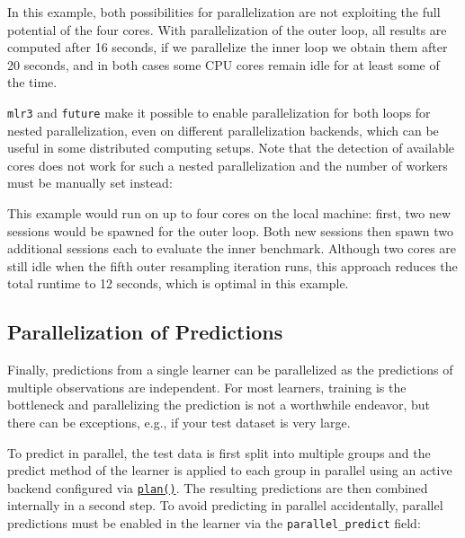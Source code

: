 In this example, both possibilities for parallelization are not
exploiting the full potential of the four cores. With parallelization of
the outer loop, all results are computed after 16 seconds, if we
parallelize the inner loop we obtain them after 20 seconds, and in both
cases some CPU cores remain idle for at least some of the time.

\texttt{mlr3} and \texttt{future} make it possible to enable
parallelization for both loops for nested parallelization, even on
different parallelization backends, which can be useful in some
distributed computing setups. Note that the detection of available cores
does not work for such a nested parallelization and the number of
workers must be manually set instead:

\begin{Shaded}
\begin{Highlighting}[]
\SpecialCharTok{::}\NormalTok{(}\NormalTok{(}
  \NormalTok{(}\NormalTok{, } \NormalTok{),}
  \NormalTok{(}\NormalTok{, } \NormalTok{)}
\NormalTok{))}
\end{Highlighting}
\end{Shaded}

This example would run on up to four cores on the local machine: first,
two new sessions would be spawned for the outer loop. Both new sessions
then spawn two additional sessions each to evaluate the inner benchmark.
Although two cores are still idle when the fifth outer resampling
iteration runs, this approach reduces the total runtime to 12 seconds,
which is optimal in this example.

\hypertarget{sec-parallel-predict}{%
\subsection{Parallelization of Predictions}\label{sec-parallel-predict}}

Finally, predictions from a single learner can be parallelized as the
predictions of multiple observations are independent. For most learners,
training is the bottleneck and parallelizing the prediction is not a
worthwhile endeavor, but there can be exceptions, e.g., if your test
dataset is very large.

To predict in parallel, the test data is first split into multiple
groups and the predict method of the learner is applied to each group in
parallel using an active backend configured via
\href{https://www.rdocumentation.org/packages/future/topics/plan}{\texttt{plan()}}.
The resulting predictions are then combined internally in a second step.
To avoid predicting in parallel accidentally, parallel predictions must
be enabled in the learner via the \texttt{parallel\_predict} field:

